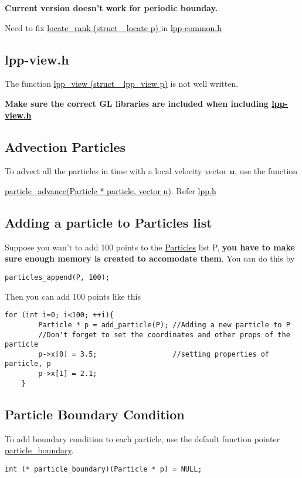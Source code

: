 \documentclass[a4paper,12pt]{article}
\newcommand{\fname}[1]{\textcolor{black}{\underline{#1}}}
\begin{document}
    \textbf{Current version doesn't work for periodic bounday.}
    
    Need to fix
    \fname{locate\_rank (struct \_locate p) } in \fname{lpp-common.h}
    \subsection{lpp-view.h}
    The function \fname{lpp\_view (struct \_lpp\_view p)} is not well written.
    
    
    \textbf{Make sure the correct GL libraries are included when including \fname{lpp-view.h} }
    
    \subsection{Advection Particles}
    To advect all the particles in time with a local velocity vector $\mathbf{u}$, use the function
    
    
    \fname{particle\_advance(Particle * particle, vector u)}. 
    Refer \fname{lpp.h}
    
    
    \subsection{Adding a particle to Particles list}
    Suppose you wan't to add 100 points to the \fname{Particles} list P, \textbf{you have to make sure enough memory is created to accomodate them}. You can do this by
    \begin{lstlisting}[style=CStyle]
    particles_append(P, 100);
    \end{lstlisting}
    
    Then you can add 100 points like this
    \begin{lstlisting}[style=CStyle]
    for (int i=0; i<100; ++i){
        Particle * p = add_particle(P); //Adding a new particle to P
        //Don't forget to set the coordinates and other props of the particle
        p->x[0] = 3.5;                  //setting properties of particle, p
        p->x[1] = 2.1;
    }
    \end{lstlisting}
    
    \subsection{Particle Boundary Condition}
    To add boundary condition to each particle, use the default function pointer \fname{particle\_boundary}. 
    \begin{lstlisting}[style=CStyle]
int (* particle_boundary)(Particle * p) = NULL;
    \end{lstlisting}
    
\end{document}
